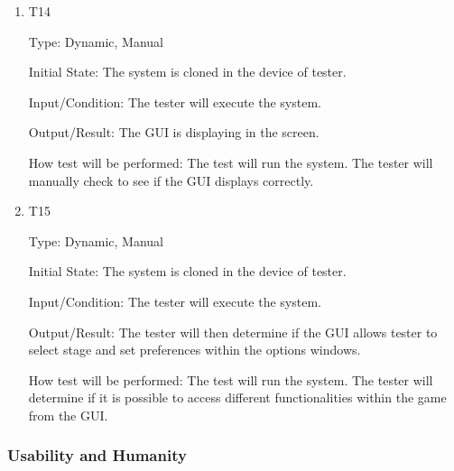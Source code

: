 \documentclass[12pt, titlepage]{article}
\begin{document}
\begin{enumerate}

\item{T14}

Type: Dynamic, Manual

Initial State: The system is cloned in the device of tester.

Input/Condition: The tester will execute the system.

Output/Result: The GUI is displaying in the screen.

How test will be performed: The test will run the system. The tester will manually check to see if the GUI displays correctly.

\item{T15}

Type: Dynamic, Manual

Initial State: The system is cloned in the device of tester.

Input/Condition: The tester will execute the system.

Output/Result:  The tester will then determine if the GUI allows tester to select stage and set preferences within the options windows.

How test will be performed: The test will run the system. The tester will determine if it is possible to access different functionalities within the game from the GUI.

\end{enumerate}

\subsubsection{Usability and Humanity}
\end{document}
